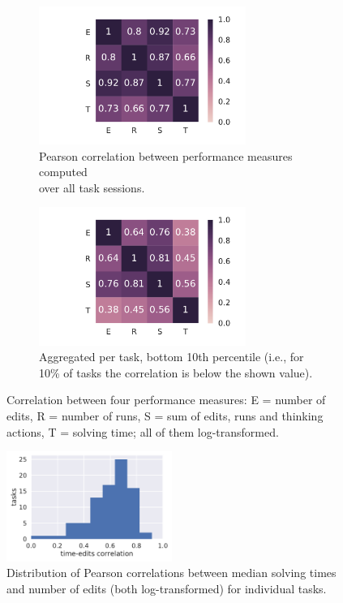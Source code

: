 \begin{figure}[htb]
\centering
\begin{subfigure}{.49\textwidth}
\centering
\includegraphics[height=45mm,trim={34mm 0 11mm 0},clip]{img/performance-corr-ts}
\caption{Pearson correlation between performance measures computed\\over all task sessions.}
\label{fig:performance-corrs-ts}
\end{subfigure}
\begin{subfigure}{.49\textwidth}
\centering
\includegraphics[height=45mm,trim={34mm 0 11mm 0},clip]{img/performance-corr-tasks-q10}
\caption{Aggregated per task, bottom 10th percentile
  (i.e., for 10\% of tasks the correlation is below the shown value).}
\label{fig:performance-corrs-p10}
\end{subfigure}
\caption{Correlation between four performance measures:
E = number of edits, R = number of runs, S = sum of edits, runs and thinking actions,
T = solving time; all of them log-transformed.}
\label{fig:performance-corrs}
\end{figure}


\begin{figure}[htb]
\centering
\includegraphics[width=0.48\textwidth]{img/time-edits-corr}
\caption{%
  Distribution of Pearson correlations between median solving times and number
  of edits (both log-transformed) for individual tasks.} %
\label{fig:time-vs-edits}
\end{figure}


